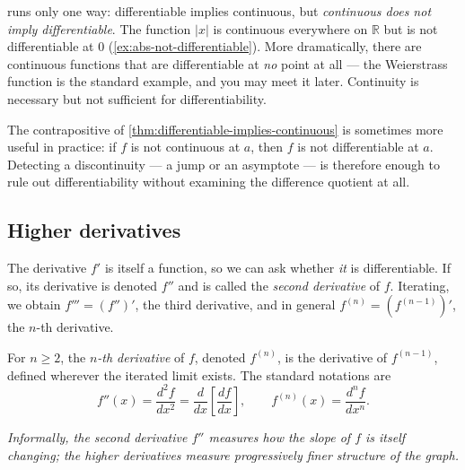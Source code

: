 \begin{caution}
 runs only one way: differentiable implies continuous, but \emph{continuous does not imply differentiable}. The function \(\lvert x \rvert\) is continuous everywhere on \(\mathbb{R}\) but is not differentiable at \(0\) (\cref{ex:abs-not-differentiable}). More dramatically, there are continuous functions that are differentiable at \emph{no} point at all --- the Weierstrass function is the standard example, and you may meet it later. Continuity is necessary but not sufficient for differentiability.
\end{caution}

The contrapositive of \cref{thm:differentiable-implies-continuous} is sometimes more useful in practice: if \(f\) is not continuous at \(a\), then \(f\) is not differentiable at \(a\). Detecting a discontinuity --- a jump or an asymptote --- is therefore enough to rule out differentiability without examining the difference quotient at all.

\subsection{Higher derivatives}

The derivative \(f'\) is itself a function, so we can ask whether \emph{it} is differentiable. If so, its derivative is denoted \(f''\) and is called the \emph{second derivative} of \(f\). Iterating, we obtain \(f''' = (f'')'\), the third derivative, and in general \(f^{(n)} = (f^{(n - 1)})'\), the \(n\)-th derivative.

\begin{definition}\label{def:higher-derivative}
For \(n \geq 2\), the \emph{\(n\)-th derivative} of \(f\), denoted \(f^{(n)}\), is the derivative of \(f^{(n - 1)}\), defined wherever the iterated limit exists. The standard notations are
\[
f''(x) = \frac{d^{2} f}{dx^{2}} = \frac{d}{dx}\!\left[\frac{df}{dx}\right], \qquad
f^{(n)}(x) = \frac{d^{n} f}{dx^{n}}.
\]

\emph{Informally, the second derivative \(f''\) measures how the slope of \(f\) is itself changing; the higher derivatives measure progressively finer structure of the graph.}
\end{definition}

